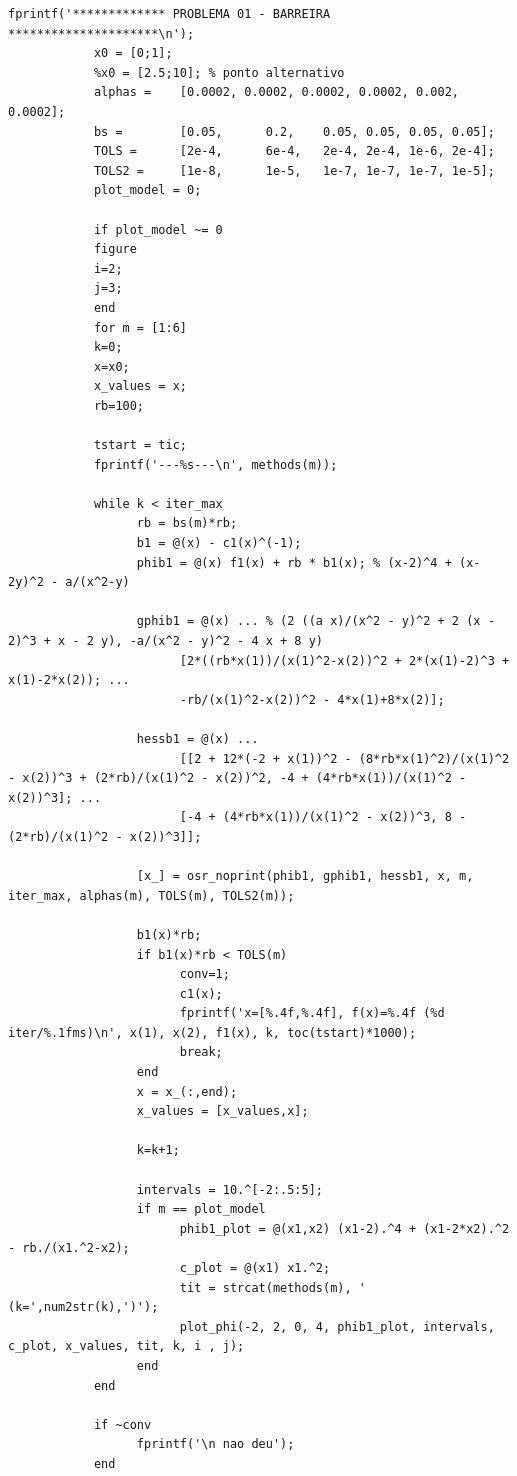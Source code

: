 \documentclass[10pt, a4paper]{article}
\begin{document}
\begin{minipage}{\linewidth}
      \begin{lstlisting}[style=myStyle, caption= trecho de c\'odigo do problema 01 (barreira), label=list_p01_bar]
            fprintf('************* PROBLEMA 01 - BARREIRA *********************\n');
            x0 = [0;1];
            %x0 = [2.5;10]; % ponto alternativo
            alphas =    [0.0002, 0.0002, 0.0002, 0.0002, 0.002, 0.0002];
            bs =        [0.05,      0.2,    0.05, 0.05, 0.05, 0.05];
            TOLS =      [2e-4,      6e-4,   2e-4, 2e-4, 1e-6, 2e-4];
            TOLS2 =     [1e-8,      1e-5,   1e-7, 1e-7, 1e-7, 1e-5];
            plot_model = 0;

            if plot_model ~= 0
            figure
            i=2;
            j=3;
            end
            for m = [1:6]
            k=0;
            x=x0;
            x_values = x;
            rb=100;

            tstart = tic;
            fprintf('---%s---\n', methods(m));

            while k < iter_max
                  rb = bs(m)*rb;
                  b1 = @(x) - c1(x)^(-1);
                  phib1 = @(x) f1(x) + rb * b1(x); % (x-2)^4 + (x-2y)^2 - a/(x^2-y)

                  gphib1 = @(x) ... % (2 ((a x)/(x^2 - y)^2 + 2 (x - 2)^3 + x - 2 y), -a/(x^2 - y)^2 - 4 x + 8 y)
                        [2*((rb*x(1))/(x(1)^2-x(2))^2 + 2*(x(1)-2)^3 + x(1)-2*x(2)); ...
                        -rb/(x(1)^2-x(2))^2 - 4*x(1)+8*x(2)];

                  hessb1 = @(x) ...
                        [[2 + 12*(-2 + x(1))^2 - (8*rb*x(1)^2)/(x(1)^2 - x(2))^3 + (2*rb)/(x(1)^2 - x(2))^2, -4 + (4*rb*x(1))/(x(1)^2 - x(2))^3]; ...
                        [-4 + (4*rb*x(1))/(x(1)^2 - x(2))^3, 8 - (2*rb)/(x(1)^2 - x(2))^3]];

                  [x_] = osr_noprint(phib1, gphib1, hessb1, x, m, iter_max, alphas(m), TOLS(m), TOLS2(m));

                  b1(x)*rb;
                  if b1(x)*rb < TOLS(m)
                        conv=1;
                        c1(x);
                        fprintf('x=[%.4f,%.4f], f(x)=%.4f (%d iter/%.1fms)\n', x(1), x(2), f1(x), k, toc(tstart)*1000);
                        break;
                  end
                  x = x_(:,end);
                  x_values = [x_values,x];

                  k=k+1;

                  intervals = 10.^[-2:.5:5];
                  if m == plot_model
                        phib1_plot = @(x1,x2) (x1-2).^4 + (x1-2*x2).^2 - rb./(x1.^2-x2);
                        c_plot = @(x1) x1.^2;
                        tit = strcat(methods(m), ' (k=',num2str(k),')');
                        plot_phi(-2, 2, 0, 4, phib1_plot, intervals, c_plot, x_values, tit, k, i , j);
                  end
            end

            if ~conv
                  fprintf('\n nao deu');
            end
      \end{lstlisting}
\end{minipage}
\end{document}
